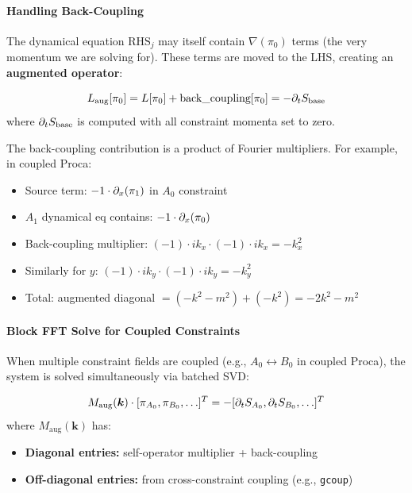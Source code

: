 \paragraph{Handling Back-Coupling}
\label{sec:cf-back-coupling}

The dynamical equation $\mathrm{RHS}_j$ may itself contain $\nabla(\pi_0)$ terms
(the very momentum we are solving for). These terms are moved to the LHS,
creating an \textbf{augmented operator}:

\begin{equation}
  L_\mathrm{aug}[\pi_0] = L[\pi_0] + \text{back\_coupling}[\pi_0] = -\partial_t S_\mathrm{base}
  \label{eq:cf-augmented}
\end{equation}
where $\partial_t S_\mathrm{base}$ is computed with all constraint momenta set to zero.

The back-coupling contribution is a product of Fourier multipliers. For
example, in coupled Proca:

\begin{itemize}
  \item Source term: $-1 \cdot \partial_x(\pi_1)$ in $A_0$ constraint
  \item $A_1$ dynamical eq contains: $-1 \cdot \partial_x(\pi_0)$
  \item Back-coupling multiplier: $(-1) \cdot ik_x \cdot (-1) \cdot ik_x = -k_x^2$
  \item Similarly for $y$: $(-1) \cdot ik_y \cdot (-1) \cdot ik_y = -k_y^2$
  \item Total: augmented diagonal $= (-k^2 - m^2) + (-k^2) = -2k^2 - m^2$
\end{itemize}

\paragraph{Block FFT Solve for Coupled Constraints}
\label{sec:cf-block-fft}

When multiple constraint fields are coupled (e.g., $A_0 \leftrightarrow B_0$ in coupled
Proca), the system is solved simultaneously via batched SVD:

\begin{equation}
  M_\mathrm{aug}(\bm{k}) \cdot [\pi_{A_0}, \pi_{B_0}, \ldots]^T = -[\partial_t S_{A_0}, \partial_t S_{B_0}, \ldots]^T
  \label{eq:cf-block-system}
\end{equation}
where $M_\mathrm{aug}(\bm{k})$ has:
\begin{itemize}
  \item \textbf{Diagonal entries:} self-operator multiplier + back-coupling
  \item \textbf{Off-diagonal entries:} from cross-constraint coupling (e.g., \texttt{gcoup})
\end{itemize}

